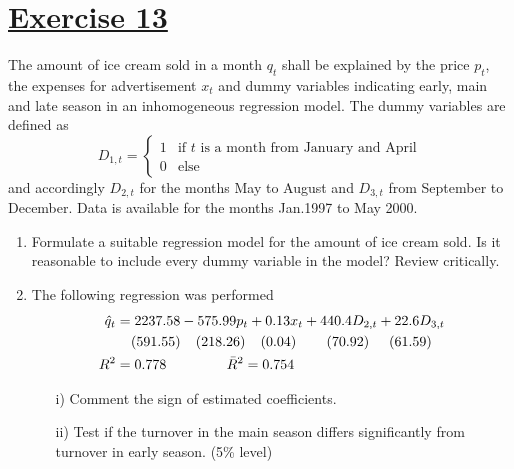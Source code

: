 \documentclass[captions=tableheading, 12pt, headings=small, parskip=half]{scrartcl}
\begin{document}
\section*{\underline{Exercise 13}}
The amount of ice cream sold in a month $q_t$ shall be explained by the price $p_t$, the expenses for advertisement $x_t$ and dummy variables indicating early, main and late season in an inhomogeneous regression model. The dummy variables are defined as
\[
	D_{1,t} = \begin{cases}1 &\text{if }t\text{ is a month from January and April}\\
	0&\text{else} \end{cases}
\]and accordingly $D_{2,t}$ for the months May to August and $D_{3, t}$ from September to December. Data is available for the months Jan.1997 to May 2000.
\begin{enumerate}[label = \alph*)]
\item Formulate a suitable regression model for the amount of ice cream sold. Is it reasonable to include every dummy variable in the model? Review critically.
\item The following regression was performed
\begin{align*}
	\hat{q}_t &= 2237.58 - 575.99 p_t + 0.13 x_t + 440.4 D_{2, t} + 22.6 D_{3, t}\\
	&\hphantom{M}(591.55)\hphantom{M}(218.26)\hphantom{M}(0.04)\hphantom{MM}(70.92)\hphantom{Mi}(61.59)\\
	R^2 &= 0.778\hphantom{MMMM} \bar{R}^2 = 0.754
\end{align*}
\begin{enumerate}
	\item[i)] Comment the sign of estimated coefficients.
	\item[ii)] Test if the turnover in the main season differs significantly from turnover in early season. (5\% level)
\end{enumerate}	
\end{enumerate}
\newpage
\end{document}
